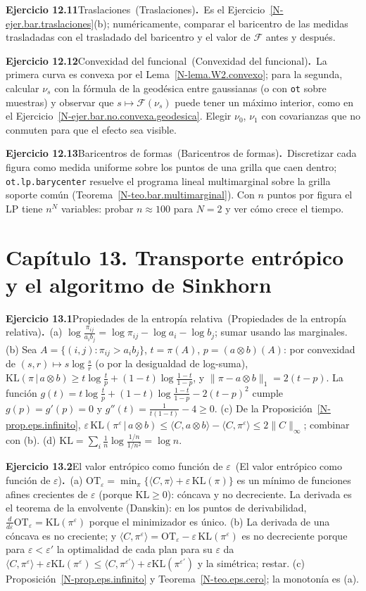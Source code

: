 \documentclass[11pt,a4paper]{amsart}
\newcommand{\ve}{\varepsilon}
\theoremstyle{remark}
\theoremstyle{definition}
\numberwithin{subsection}{section}
\numberwithin{equation}{section}
\newcommand{\ejlabel}[2]{\par\medskip\noindent\textbf{Ejercicio #1}\ifx\relax#2\relax\else\ (#2)\fi\textbf{.}\ }
\begin{document}
\ejlabel{12.11}{Traslaciones}Es el Ejercicio~\ref{N-ejer.bar.traslaciones}(b); numéricamente, comparar el baricentro de las medidas trasladadas con el trasladado del baricentro y el valor de $\mathcal F$ antes y después.

\ejlabel{12.12}{Convexidad del funcional}La primera curva es convexa por el Lema~\ref{N-lema.W2.convexo}; para la segunda, calcular $\nu_s$ con la fórmula de la geodésica entre gaussianas (o con \texttt{ot} sobre muestras) y observar que $s\mapsto\mathcal F(\nu_s)$ puede tener un máximo interior, como en el Ejercicio~\ref{N-ejer.bar.no.convexa.geodesica}. Elegir $\nu_0$, $\nu_1$ con covarianzas que no conmuten para que el efecto sea visible.

\ejlabel{12.13}{Baricentros de formas}Discretizar cada figura como medida uniforme sobre los puntos de una grilla que caen dentro; \texttt{ot.lp.barycenter} resuelve el programa lineal multimarginal sobre la grilla soporte común (Teorema~\ref{N-teo.bar.multimarginal}). Con $n$ puntos por figura el LP tiene $n^N$ variables: probar $n\approx100$ para $N=2$ y ver cómo crece el tiempo.

\section*{Capítulo 13. Transporte entrópico y el algoritmo de Sinkhorn}
\ejlabel{13.1}{Propiedades de la entropía relativa}(a) $\log\frac{\pi_{ij}}{a_ib_j}=\log\pi_{ij}-\log a_i-\log b_j$; sumar usando las marginales. (b) Sea $A=\{(i,j):\pi_{ij}>a_ib_j\}$, $t=\pi(A)$, $p=(a\otimes b)(A)$: por convexidad de $(s,r)\mapsto s\log\frac sr$ (o por la desigualdad de log-suma), $\mathrm{KL}(\pi\,|\,a\otimes b)\ge t\log\frac tp+(1-t)\log\frac{1-t}{1-p}$, y $\|\pi-a\otimes b\|_1=2(t-p)$. La función $g(t)=t\log\frac tp+(1-t)\log\frac{1-t}{1-p}-2(t-p)^2$ cumple $g(p)=g'(p)=0$ y $g''(t)=\frac1{t(1-t)}-4\ge0$. (c) De la Proposición~\ref{N-prop.eps.infinito}, $\ve\,\mathrm{KL}(\pi^\ve\,|\,a\otimes b)\le\langle C,a\otimes b\rangle-\langle C,\pi^\ve\rangle\le2\|C\|_\infty$; combinar con (b). (d) $\mathrm{KL}=\sum_i\frac1n\log\frac{1/n}{1/n^2}=\log n$.

\ejlabel{13.2}{El valor entrópico como función de $\ve$}(a) $\mathrm{OT}_\ve=\min_\pi\{\langle C,\pi\rangle+\ve\,\mathrm{KL}(\pi)\}$ es un mínimo de funciones afines crecientes de $\ve$ (porque $\mathrm{KL}\ge0$): cóncava y no decreciente. La derivada es el teorema de la envolvente (Danskin): en los puntos de derivabilidad, $\frac d{d\ve}\mathrm{OT}_\ve=\mathrm{KL}(\pi^\ve)$ porque el minimizador es único. (b) La derivada de una cóncava es no creciente; y $\langle C,\pi^\ve\rangle=\mathrm{OT}_\ve-\ve\,\mathrm{KL}(\pi^\ve)$ es no decreciente porque para $\ve<\ve'$ la optimalidad de cada plan para su $\ve$ da $\langle C,\pi^\ve\rangle+\ve\mathrm{KL}(\pi^\ve)\le\langle C,\pi^{\ve'}\rangle+\ve\mathrm{KL}(\pi^{\ve'})$ y la simétrica; restar. (c) Proposición~\ref{N-prop.eps.infinito} y Teorema~\ref{N-teo.eps.cero}; la monotonía es (a).
\end{document}
